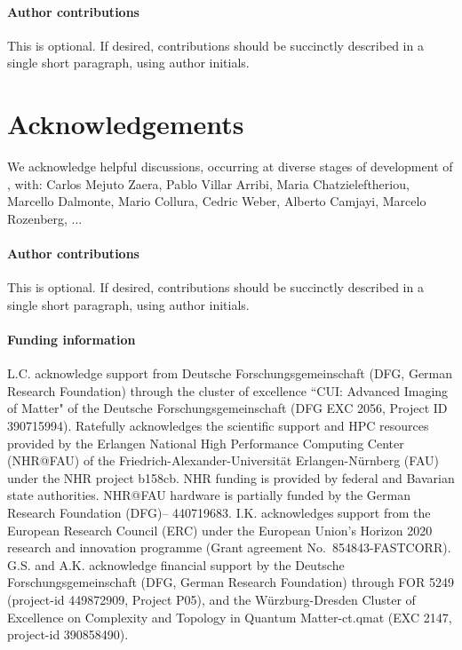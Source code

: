 \documentclass[edipack_sp.tex]{subfiles}
\begin{document}

\paragraph{Author contributions}
This is optional. If desired, contributions should be succinctly described in a single short paragraph, using author initials.


\section*{Acknowledgements}
We acknowledge helpful discussions, occurring at diverse stages of development of \NAME, with: Carlos Mejuto Zaera, Pablo Villar Arribi, Maria Chatzieleftheriou, Marcello Dalmonte, Mario Collura, Cedric Weber, Alberto Camjayi, Marcelo Rozenberg, ...   

\paragraph{Author contributions}
This is optional. If desired, contributions should be succinctly described in a single short paragraph, using author initials.

\paragraph{Funding information}
L.C. acknowledge support from Deutsche Forschungsgemeinschaft (DFG, German Research Foundation) thr\-ough the cluster of excellence ``CUI: Advanced Imaging of Matter" of the Deutsche Forschungsgemeinschaft (DFG EXC 2056, Project ID 390715994). Ratefully acknowledges the scientific support and HPC resources provided by the Erlangen National High Performance Computing Center (NHR@FAU) of the Friedrich-Alexander-Universität Erlangen-Nürnberg (FAU) under the NHR project b158cb. NHR funding is provided by federal and Bavarian state authorities. NHR@FAU hardware is partially funded by the German Research Foundation (DFG)– 440719683.
I.K. acknowledges support from the European Research Council (ERC) under the European Union's Horizon 2020 research and innovation programme (Grant agreement No.~854843-FASTCORR).
G.S. and A.K. acknowledge financial support by the Deutsche Forschungsgemeinschaft (DFG, German Research Foundation) through FOR 5249 (project-id 449872909, Project P05), and the W\"urzburg-Dresden Cluster of Excellence on Complexity and Topology in Quantum Matter-ct.qmat (EXC 2147, project-id 390858490).
\end{document}
